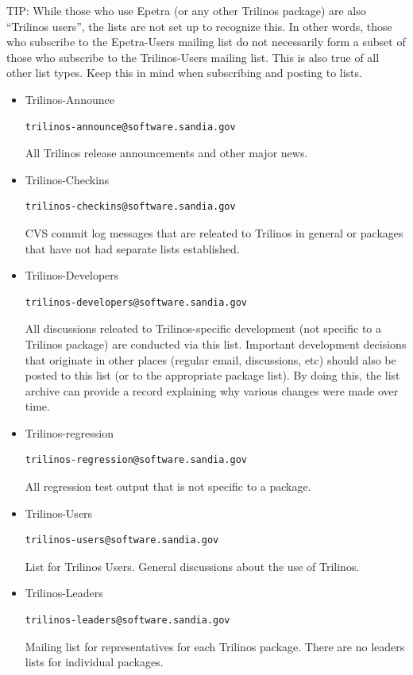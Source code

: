 \documentclass[12pt,relax]{TrilinosDevGuide}
\begin{document}
TIP: While those who use Epetra (or any other Trilinos package) are also
``Trilinos users'', the lists are not set up to recognize this.  In other 
words, those who subscribe to the Epetra-Users mailing list do not necessarily 
form a subset of those who subscribe to the Trilinos-Users mailing list.  This 
is also true of all other list types.  Keep this in mind when subscribing and 
posting to lists.
\begin{itemize}
\item Trilinos-Announce 
\begin{verbatim}trilinos-announce@software.sandia.gov\end{verbatim}

All Trilinos release announcements and other major news.

\item Trilinos-Checkins 
\begin{verbatim}trilinos-checkins@software.sandia.gov\end{verbatim}

CVS commit log messages that are releated to Trilinos in general or packages 
that have not had separate lists established.

\item Trilinos-Developers 
\begin{verbatim}trilinos-developers@software.sandia.gov\end{verbatim}

All discussions releated to Trilinos-specific development (not specific to a 
Trilinos package) are conducted via this list.  Important development 
decisions that originate in other places (regular email, discussions, etc) 
should also be posted to this list (or to the appropriate package list).  
By doing this, the list archive can provide a record explaining why various 
changes were made over time.

\item Trilinos-regression 
\begin{verbatim}trilinos-regression@software.sandia.gov\end{verbatim}

All regression test output that is not specific to a package. 

\item Trilinos-Users 
\begin{verbatim}trilinos-users@software.sandia.gov\end{verbatim}

List for Trilinos Users.  General discussions about the use of Trilinos.

\item Trilinos-Leaders
\begin{verbatim}trilinos-leaders@software.sandia.gov\end{verbatim}

Mailing list for representatives for each Trilinos package.  There are no 
leaders lists for individual packages.
\end{itemize}
\end{document}
